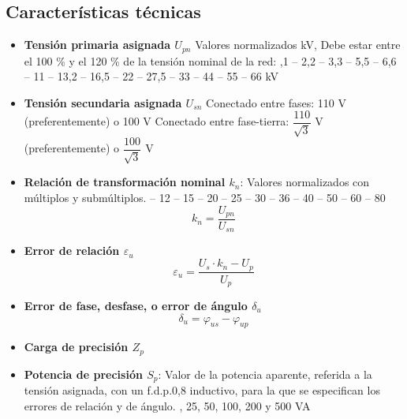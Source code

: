 \subsection{Características técnicas}
\begin{itemize}
	\item \textbf{Tensión primaria asignada $U_{pn}$} Valores normalizados kV, Debe estar entre el 100 \% y el 120 \% de la tensión nominal de la red:
	,1 – 2,2 – 3,3 – 5,5 – 6,6 – 11 – 13,2 – 16,5 – 22 – 27,5 – 33 – 44 – 55 – 66 kV
	\item \textbf{Tensión secundaria asignada $U_{sn}$} 
	\newline
	Conectado entre fases: 110 V (preferentemente) o 100 V
	\newline
	Conectado entre fase-tierra: $\dfrac{110}{\sqrt{3}}$ V (preferentemente) o $\dfrac{100}{\sqrt{3}}$ V
	\item \textbf{Relación de transformación nominal $k_n$}: Valores normalizados con múltiplos y submúltiplos.
	 – 12 – 15 – 20 – 25 – 30 – 36 – 40 – 50 – 60 – 80 
	\begin{equation}
		k_n=\dfrac{U_{pn}}{U_{sn}}
	\end{equation}
	\item \textbf{Error de relación $\varepsilon_u$}
	\begin{equation}
		\varepsilon_u=\dfrac{U_s\cdot k_n -U_p}{U_p}
	\end{equation}
	\item \textbf{Error de fase, desfase, o error de ángulo $\delta_u$}
	\begin{equation}
		\delta_u=\varphi_{us}-\varphi_{up}
	\end{equation}
	\item \textbf{Carga de precisión $Z_p$}
	\item \textbf{Potencia de precisión $S_p$}: Valor de la potencia aparente, referida a la tensión asignada, con un f.d.p.0,8 inductivo, para la que se especifican los errores de relación y de ángulo.
	 , 25, 50, 100, 200 y 500 VA
	

\end{itemize}
